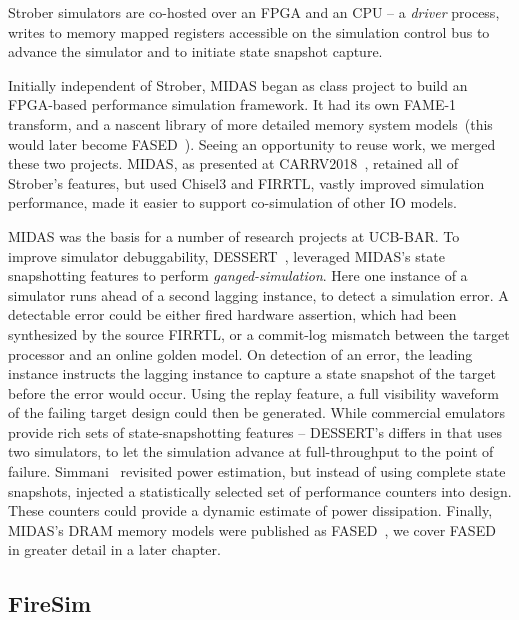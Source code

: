 Strober simulators are co-hosted over an FPGA and an CPU -- a \emph{driver}
process, writes to memory mapped registers accessible on the simulation control
bus to advance the simulator and to initiate state snapshot capture.

Initially independent of Strober, MIDAS began as class project to build an
FPGA-based performance simulation framework. It had its own FAME-1 transform,
and a nascent library of more detailed memory system models~(this would later
become FASED~\cite{FASED}).  Seeing an opportunity to reuse work, we merged
these two projects. MIDAS, as presented at CARRV2018~\cite{MIDAS}, retained all
of Strober's features, but used Chisel3 and FIRRTL, vastly improved simulation
performance, made it easier to support co-simulation of other IO models.

MIDAS was the basis for a number of research projects at UCB-BAR. To improve simulator debuggability, DESSERT~\cite{DESSERT},
leveraged MIDAS's state snapshotting features to perform
\emph{ganged-simulation}. Here one instance of a simulator runs ahead of a second lagging instance, to
detect a simulation error. A detectable error could be either fired hardware assertion, which had been synthesized by the source FIRRTL, or a
commit-log mismatch between the target processor and an online golden model.
On detection of an error, the leading instance instructs the lagging instance to capture a
state snapshot of the target before the error would occur.  Using the replay feature, a
full visibility waveform of the failing target design could then be generated. While
commercial emulators provide rich sets of state-snapshotting features --
DESSERT's differs in that uses two simulators, to let the simulation advance at
full-throughput to the point of failure. Simmani~\cite{Simmani} revisited power
estimation, but instead of using complete state snapshots, injected
a statistically selected set of performance counters into design. These counters
could provide a dynamic estimate of power dissipation. Finally,
MIDAS's DRAM memory models were published as FASED~\cite{FASED}, we cover FASED
in greater detail in a later chapter.

\subsection{FireSim}


